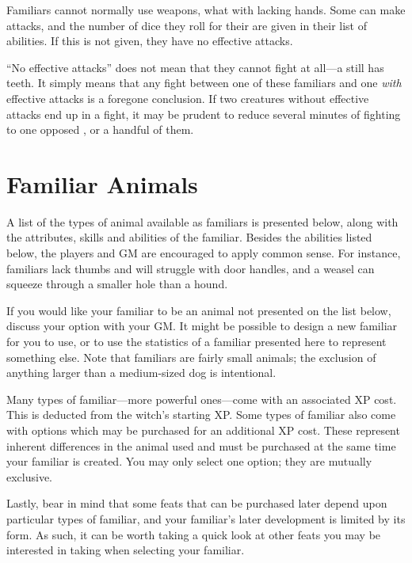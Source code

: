 Familiars cannot normally use weapons, what with lacking hands.
Some can make {\unarmed} attacks, and the number of dice they roll for their {\damagetests} are given in their list of abilities.
If this is not given, they have no effective attacks.

``No effective attacks'' does not mean that they cannot fight at all---a  still has teeth.
It simply means that any fight between one of these familiars and one \emph{with} effective attacks is a foregone conclusion.
If two creatures without effective attacks end up in a fight, it may be prudent to reduce several minutes of fighting to one opposed {\test}, or a handful of them.

\section{Familiar Animals}

A list of the types of animal available as familiars is presented below, along with the attributes, skills and abilities of the familiar.
Besides the abilities listed below, the players and GM are encouraged to apply common sense.
For instance, familiars lack thumbs and will struggle with door handles, and a weasel can squeeze through a smaller hole than a hound.

If you would like your familiar to be an animal not presented on the list below, discuss your option with your GM.
It might be possible to design a new familiar for you to use, or to use the statistics of a familiar presented here to represent something else.
Note that familiars are fairly small animals; the exclusion of anything larger than a medium-sized dog is intentional.

Many types of familiar---more powerful ones---come with an associated XP cost.
This is deducted from the witch's starting XP.
Some types of familiar also come with options which may be purchased for an additional XP cost.
These represent inherent differences in the animal used and must be purchased at the same time your familiar is created.
You may only select one option; they are mutually exclusive.

Lastly, bear in mind that some feats that can be purchased later depend upon particular types of familiar, and your familiar's later development is limited by its form.
As such, it can be worth taking a quick look at other feats you may be interested in taking when selecting your familiar.

